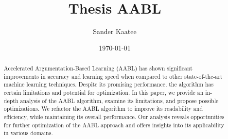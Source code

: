 \documentclass{article}
\title{Thesis AABL}
\author{Sander Kaatee}
\date{\today}
\begin{document}
\maketitle
\begin{abstract}
\noindent
Accelerated Argumentation-Based Learning (AABL) has shown significant improvements in accuracy and learning speed when compared to other state-of-the-art machine learning techniques. Despite its promising performance, the algorithm has certain limitations and potential for optimization. In this paper, we provide an in-depth analysis of the AABL algorithm, examine its limitations, and propose possible optimizations. We refactor the AABL algorithm to improve its readability and efficiency, while maintaining its overall performance. Our analysis reveals opportunities for further optimization of the AABL approach and offers insights into its applicability in various domains.
\end{abstract}
\end{document}
